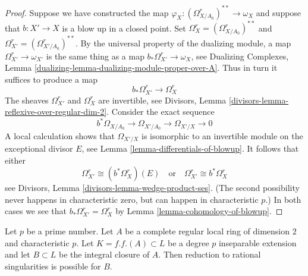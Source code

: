 \begin{proof}
Suppose we have constructed the map
$\varphi_X : (\Omega^r_{X/A_0})^{**} \to \omega_X$
and suppose that $b : X' \to X$ is a blow up in a closed point.
Set $\Omega^r_X = (\Omega^r_{X/A_0})^{**}$ and
$\Omega^r_{X'} = (\Omega^r_{X'/A_0})^{**}$.
By the universal property of the dualizing module, a map
$\Omega^r_{X'} \to \omega_{X'}$ is the same thing as a map
$b_*\Omega^r_{X'} \to \omega_X$, see
Dualizing Complexes, Lemma \ref{dualizing-lemma-dualizing-module-proper-over-A}.
Thus in turn it suffices to produce a map
$$
b_*\Omega^r_{X'} \longrightarrow \Omega^r_X
$$
The sheaves $\Omega^r_{X'}$ and $\Omega^r_X$ are invertible, see
Divisors, Lemma \ref{divisors-lemma-reflexive-over-regular-dim-2}.
Consider the exact sequence
$$
b^*\Omega_{X/A_0} \to \Omega_{X'/A_0} \to \Omega_{X'/X} \to 0
$$
A local calculation shows that $\Omega_{X'/X}$ is isomorphic
to an invertible module on the exceptional divisor $E$, see
Lemma \ref{lemma-differentials-of-blowup}. It follows that
either
$$
\Omega^r_{X'} \cong (b^*\Omega^r_X)(E)
\quad\text{or}\quad
\Omega^r_{X'} \cong b^*\Omega^r_X
$$
see Divisors, Lemma \ref{divisors-lemma-wedge-product-ses}.
(The second possibility never happens in characteristic zero, but
can happen in characteristic $p$.) In both cases we see that
$b_*\Omega^r_{X'} = \Omega^r_X$ by Lemma \ref{lemma-cohomology-of-blowup}.
\end{proof}

\begin{lemma}
\label{lemma-go-up-degree-p}
Let $p$ be a prime number. Let $A$ be a complete regular local ring of
dimension $2$ and characteristic $p$. Let $K = f.f.(A) \subset L$ be a
degree $p$ inseparable extension and let $B \subset L$ be the integral
closure of $A$. Then reduction to rational singularities is possible for $B$.
\end{lemma}

